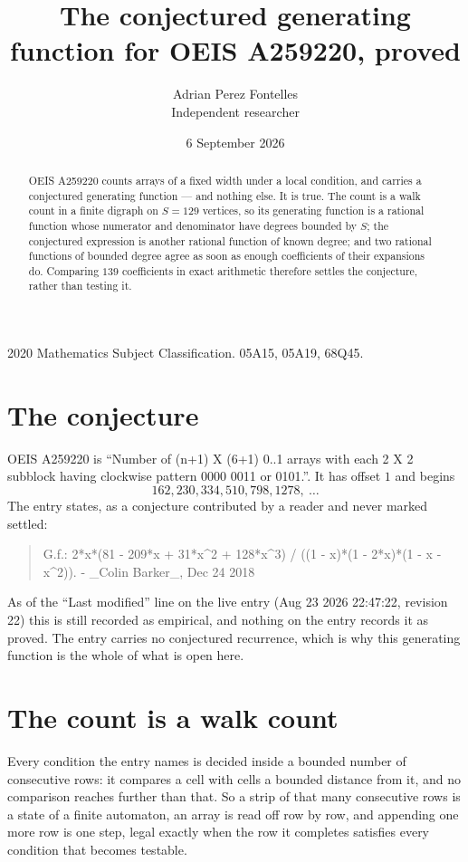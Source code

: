 \documentclass[11pt,a4paper]{article}
\title{The conjectured generating function for OEIS A259220, proved}
\author{Adrian Perez Fontelles\\ \small Independent researcher}
\date{6 September 2026}
\theoremstyle{plain}
\theoremstyle{definition}
\begin{document}
\maketitle

\begin{abstract}
OEIS A259220 counts arrays of a fixed width under a local condition, and carries a conjectured
generating function --- and nothing else. It is true. The count is a walk count in a finite
digraph on $S=129$ vertices, so its generating function is a rational function whose numerator
and denominator have degrees bounded by $S$; the conjectured expression is another rational
function of known degree; and two rational functions of bounded degree agree as soon as enough
coefficients of their expansions do. Comparing $139$ coefficients in exact arithmetic
therefore settles the conjecture, rather than testing it.
\end{abstract}

\noindent\small 2020 Mathematics Subject Classification. 05A15, 05A19, 68Q45.\normalsize

\section{The conjecture}

OEIS A259220 is ``Number of (n+1) X (6+1) 0..1 arrays with each 2 X 2 subblock having clockwise pattern 0000 0011 or 0101.''. It has offset $1$ and begins
\[
162, 230, 334, 510, 798, 1278,\ \dots
\]
The entry states, as a conjecture contributed by a reader and never marked settled:
\begin{quote}
G.f.: 2*x*(81 - 209*x + 31*x\^{}2 + 128*x\^{}3) / ((1 - x)*(1 - 2*x)*(1 - x - x\^{}2)). - \_Colin Barker\_, Dec 24 2018
\end{quote}
As of the ``Last modified'' line on the live entry (Aug 23 2026 22:47:22, revision 22) this is still
recorded as empirical, and nothing on the entry records it as proved. The entry carries no
conjectured recurrence, which is why this generating function is the whole of what is open
here.

\section{The count is a walk count}

Every condition the entry names is decided inside a bounded number of consecutive rows: it
compares a cell with cells a bounded distance from it, and no comparison reaches further than
that. So a strip of that many consecutive rows is a state of a finite automaton, an array is
read off row by row, and appending one more row is one step, legal exactly when the row it
completes satisfies every condition that becomes testable.
\end{document}

